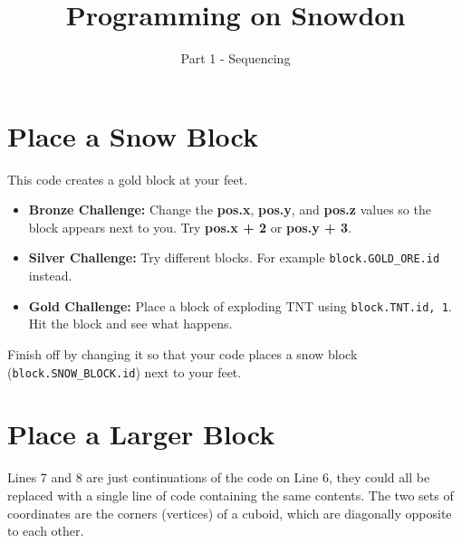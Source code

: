 \documentclass{geocraft-worksheet}
\begin{document}
\title{Programming on Snowdon}
\subtitle{Part 1 - Sequencing}

\maketitle


\section{Place a Snow Block}\vspace{-0.5cm}
\lstset{language=Python}

\noindent%
%
\vspace{0.2cm}
%
%

\noindent This code creates a gold block at your feet.\\

\begin{itemize}
\item\textbf{Bronze Challenge:} Change the \textbf{pos.x}, \textbf{pos.y}, and \textbf{pos.z} values so the block
  appears next to you. \newline Try \textbf{pos.x + 2} or \textbf{pos.y + 3}.  

\item\textbf{Silver Challenge:} Try different blocks. For example
\lstinline{block.GOLD_ORE.id} instead. 

\item\textbf{Gold Challenge:} Place a block of exploding TNT using
\lstinline{block.TNT.id, 1}. Hit the block and see what happens.
\end{itemize}

\noindent Finish off by changing it so that your code places a snow block
(\lstinline{block.SNOW_BLOCK.id}) next to your feet.

\section{Place a Larger Block}\vspace{-0.5cm}

\noindent%
%
\vspace{0.2cm}
%
%

\noindent Lines 7 and 8 are just continuations of the code on Line 6, they could all be replaced with a single line of
code containing the same contents. The two sets of coordinates are the corners (vertices) of a cuboid, which are
diagonally opposite to each other.
\end{document}
